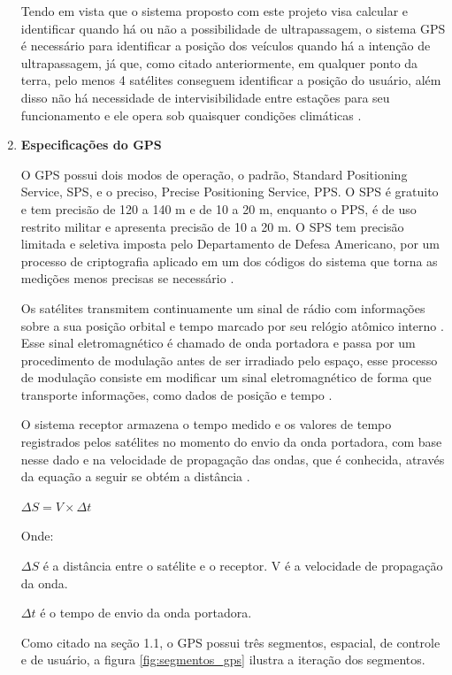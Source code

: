 \begin{enumerate}
Tendo em vista que o sistema proposto com este projeto visa calcular e
identificar quando há ou não a possibilidade de ultrapassagem, o sistema
GPS é necessário para identificar a posição dos veículos quando há a
intenção de ultrapassagem, já que, como citado anteriormente, em qualquer
ponto da terra, pelo menos 4 satélites conseguem identificar a posição do
usuário, além disso não há necessidade de intervisibilidade entre estações
para seu funcionamento e ele opera sob quaisquer condições climáticas \cite{sobre_gps}.

\item \textbf{Especificações do GPS}

O GPS possui dois modos de operação, o padrão, Standard Positioning Service,
SPS, e o preciso, Precise Positioning Service, PPS. O SPS é gratuito e tem
precisão de 120 a 140 m e de 10 a 20 m, enquanto o PPS, é de uso restrito
militar e apresenta precisão de 10 a 20 m. O SPS tem precisão limitada e
seletiva imposta pelo Departamento de Defesa Americano, por um processo de
criptografia aplicado em um dos códigos do sistema que torna as medições
menos precisas se necessário \cite{6gps}.

Os satélites transmitem continuamente um sinal de rádio com informações sobre
a sua posição orbital e tempo marcado por seu relógio atômico interno \cite{7gps}.
 Esse sinal eletromagnético é chamado de onda portadora e passa por um
 procedimento de modulação antes de ser irradiado pelo espaço, esse processo
 de modulação consiste em modificar um sinal eletromagnético de forma que
 transporte informações, como dados de posição e tempo \cite{8gps}.

O sistema receptor armazena o tempo medido e os valores de tempo registrados
pelos satélites no momento do envio da onda portadora, com base nesse dado e
 na velocidade de propagação das ondas, que é conhecida, através da equação
 a seguir se obtém a distância \cite{8gps}.

 $ \Delta S = V \times  \Delta t $

 Onde:

 $ \Delta S $ é a distância entre o satélite e o receptor.
V é a velocidade de propagação da onda.

$ \Delta t $ é o tempo de envio da onda portadora.

Como citado na seção 1.1, o GPS possui três segmentos, espacial, de controle e
de usuário, a figura \ref{fig:segmentos_gps} ilustra a iteração dos segmentos.



\end{enumerate}
